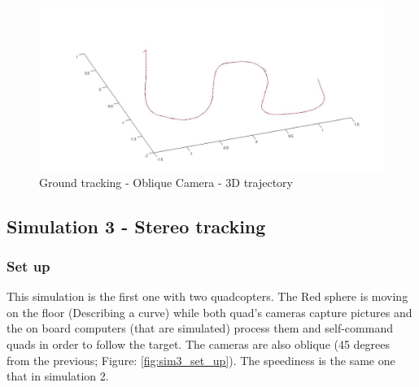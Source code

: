\begin{figure}[h]
\centering
\includegraphics[width=0.7\linewidth]{../Images/c3/sim2_traj_both_3d}
\caption{Ground tracking - Oblique Camera - 3D trajectory}
\label{fig:sim2_traj_both_3d}
\end{figure}




\subsection{Simulation 3 - Stereo tracking}
\subsubsection{Set up}
This simulation is the first one with two quadcopters. The Red sphere is moving on the floor (Describing a curve) while both quad's cameras capture pictures and the on board computers (that are simulated) process them and self-command quads in order to follow the target. The cameras are also oblique (45 degrees from the previous; Figure: \ref{fig:sim3_set_up}). The speediness is the same one that in simulation 2.

